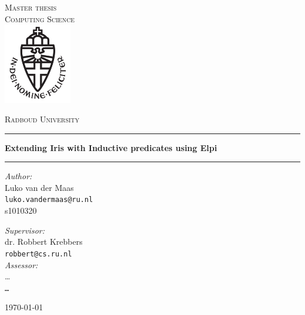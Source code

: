 \documentclass[11pt,a4paper]{report}
\begin{document}
\VerbatimFootnotes

\renewcommand{\sectionautorefname}{Section}
\renewcommand{\subsectionautorefname}{Section}
\renewcommand{\chapterautorefname}{Chapter}

\begin{titlepage}
    \begin{center}
        \textsc{\LARGE Master thesis\\Computing Science}\\[1.5cm]
        \includegraphics[height=100pt]{logo}

        \vspace{0.4cm}
        \textsc{\Large Radboud University}\\[1cm]
        \hrule
        \vspace{0.4cm}
        \textbf{\huge Extending Iris with Inductive predicates using Elpi}\\[0.4cm]
        \hrule
        \vspace{2cm}
        \begin{minipage}[t]{0.45\textwidth}
            \begin{flushleft} \large
                \textit{Author:}\\
                Luko van der Maas\\
                \texttt{luko.vandermaas@ru.nl}\\
                s1010320
            \end{flushleft}
        \end{minipage}
        \begin{minipage}[t]{0.45\textwidth}
            \begin{flushright} \large
                \textit{Supervisor:}\\
                dr. Robbert Krebbers\\
                \texttt{robbert@cs.ru.nl}\\[1.3cm]
                \textit{Assessor:}\\
                \dots\\
                \texttt{\dots}
            \end{flushright}
        \end{minipage}
        \vfill
        {\large \today}
    \end{center}
\end{titlepage}
\end{document}
